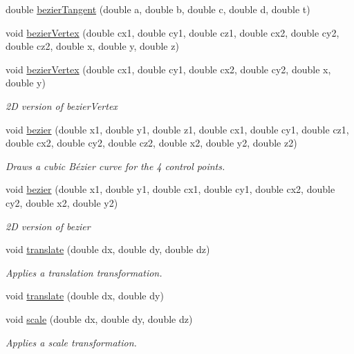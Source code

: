 \begin{DoxyCompactItemize}
\item 
double \hyperlink{namespacecprocessing_abbb2d5344f97242bed221f93567c3bd9}{bezier\-Tangent} (double a, double b, double c, double d, double t)
\item 
void \hyperlink{namespacecprocessing_abefd6e82adec560aeb65511d5c04ec62}{bezier\-Vertex} (double cx1, double cy1, double cz1, double cx2, double cy2, double cz2, double x, double y, double z)
\item 
void \hyperlink{namespacecprocessing_a36c29d340db4d37f305d06d8408ef22d}{bezier\-Vertex} (double cx1, double cy1, double cx2, double cy2, double x, double y)
\begin{DoxyCompactList}\small\item\em 2\-D version of bezier\-Vertex \end{DoxyCompactList}\item 
void \hyperlink{namespacecprocessing_ab3bb61d1bd0741647c5f43163844e6a3}{bezier} (double x1, double y1, double z1, double cx1, double cy1, double cz1, double cx2, double cy2, double cz2, double x2, double y2, double z2)
\begin{DoxyCompactList}\small\item\em \-Draws a cubic \-Bézier curve for the 4 control points. \end{DoxyCompactList}\item 
void \hyperlink{namespacecprocessing_a5ec53e4626a728b9525286cd281b4796}{bezier} (double x1, double y1, double cx1, double cy1, double cx2, double cy2, double x2, double y2)
\begin{DoxyCompactList}\small\item\em 2\-D version of bezier \end{DoxyCompactList}\item 
void \hyperlink{namespacecprocessing_a0e437a343ef6fb18eb0212c24ddbf7b2}{translate} (double dx, double dy, double dz)
\begin{DoxyCompactList}\small\item\em \-Applies a translation transformation. \end{DoxyCompactList}\item 
void \hyperlink{namespacecprocessing_ae482816a2ac74376fface1261abbe47e}{translate} (double dx, double dy)
\item 
void \hyperlink{namespacecprocessing_a57d46ddaf4025cdf290f5ccb82725530}{scale} (double dx, double dy, double dz)
\begin{DoxyCompactList}\small\item\em \-Applies a scale transformation. \end{DoxyCompactList}\item 

\end{DoxyCompactItemize}
